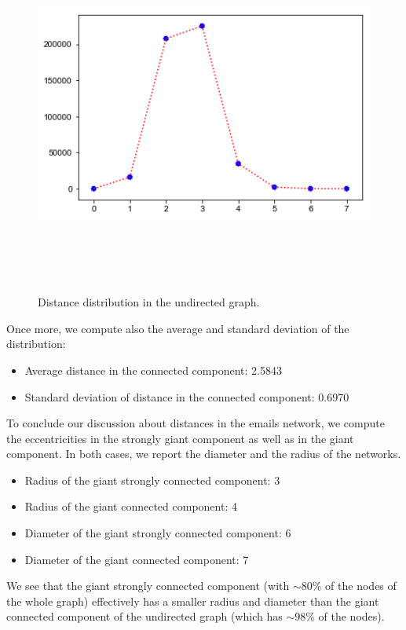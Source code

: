 \documentclass{report}
\theoremstyle{definition}
\theoremstyle{remark}
\begin{document}
\begin{figure} [H]
	\centering
	\centerline{\includegraphics[width = 13cm, height = 12cm, keepaspectratio]{distance_distribution_und.png}}
	\label{Dist_und}
	\caption{Distance distribution in the undirected graph.}
\end{figure}
Once more, we compute also the average and standard deviation of the distribution:
 \begin{itemize}
	\item Average distance in the connected component: 2.5843
	\item Standard deviation of distance in the connected component: 0.6970
\end{itemize}
To conclude our discussion about distances in the emails network, we compute the eccentricities in the strongly giant component as well as in the giant component. In both cases, we report the diameter and the radius of the networks.
\begin{itemize}
	\item Radius of the giant strongly connected component: 3
	\item Radius of the giant connected component: 4
	\item Diameter of the giant strongly connected component: 6
	\item Diameter of the giant connected component: 7
\end{itemize}
We see that the giant strongly connected component (with $\sim80\%$ of the nodes of the whole graph) effectively has a smaller radius and diameter than the giant connected component of the undirected graph (which has $\sim98\%$ of the nodes).
\end{document}
